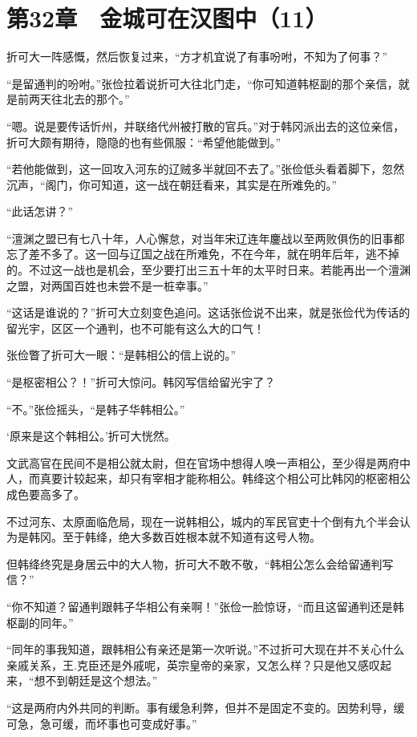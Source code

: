 \section{第32章　金城可在汉图中（11）}

折可大一阵感慨，然后恢复过来，“方才机宜说了有事吩咐，不知为了何事？”

“是留通判的吩咐。”张俭拉着说折可大往北门走，“你可知道韩枢副的那个亲信，就是前两天往北去的那个。”

“嗯。说是要传话忻州，并联络代州被打散的官兵。”对于韩冈派出去的这位亲信，折可大颇有期待，隐隐的也有些佩服：“希望他能做到。”

“若他能做到，这一回攻入河东的辽贼多半就回不去了。”张俭低头看着脚下，忽然沉声，“阁门，你可知道，这一战在朝廷看来，其实是在所难免的。”

“此话怎讲？”

“澶渊之盟已有七八十年，人心懈怠，对当年宋辽连年鏖战以至两败俱伤的旧事都忘了差不多了。这一回与辽国之战在所难免，不在今年，就在明年后年，逃不掉的。不过这一战也是机会，至少要打出三五十年的太平时日来。若能再出一个澶渊之盟，对两国百姓也未尝不是一桩幸事。”

“这话是谁说的？”折可大立刻变色追问。这话张俭说不出来，就是张俭代为传话的留光宇，区区一个通判，也不可能有这么大的口气！

张俭瞥了折可大一眼：“是韩相公的信上说的。”

“是枢密相公？！”折可大惊问。韩冈写信给留光宇了？

“不。”张俭摇头，“是韩子华韩相公。”

‘原来是这个韩相公。’折可大恍然。

文武高官在民间不是相公就太尉，但在官场中想得人唤一声相公，至少得是两府中人，而真要计较起来，却只有宰相才能称相公。韩绛这个相公可比韩冈的枢密相公成色要高多了。

不过河东、太原面临危局，现在一说韩相公，城内的军民官吏十个倒有九个半会认为是韩冈。至于韩绛，绝大多数百姓根本就不知道有这号人物。

但韩绛终究是身居云中的大人物，折可大不敢不敬，“韩相公怎么会给留通判写信？”

“你不知道？留通判跟韩子华相公有亲啊！”张俭一脸惊讶，“而且这留通判还是韩枢副的同年。”

“同年的事我知道，跟韩相公有亲还是第一次听说。”不过折可大现在并不关心什么亲戚关系，王.克臣还是外戚呢，英宗皇帝的亲家，又怎么样？只是他又感叹起来，“想不到朝廷是这个想法。”

“这是两府内外共同的判断。事有缓急利弊，但并不是固定不变的。因势利导，缓可急，急可缓，而坏事也可变成好事。”

